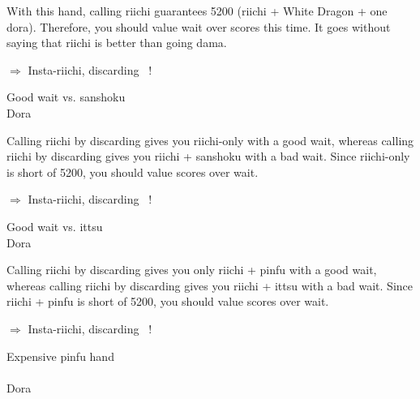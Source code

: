\noindent With this hand, calling riichi guarantees 5200 (riichi + White Dragon + one {\jap dora}). Therefore, you should value wait over scores this time. It goes without saying that riichi is better than going {\jap dama}. 

\begin{center}
{\Large $\Rightarrow$ Insta-riichi, discarding  ~!}
\end{center}

\bigskip
\begin{itembox}[r]{Good wait vs. {\jap sanshoku}}
\bp
{}~~\bei\\
\hfill\footnotesize{{\jap Dora}~~~~~~~}
\ep {}
\vspace{-15pt}
\end{itembox}

\noindent Calling riichi by discarding {\LARGE {}} gives you riichi-only with a good wait, whereas calling riichi by discarding {\LARGE {}} gives you riichi + {\jap sanshoku} with a bad wait. Since riichi-only is short of 5200, you should value scores over wait. 

\begin{center}
{\Large $\Rightarrow$ Insta-riichi, discarding  ~!}
\end{center}

\bigskip
\begin{itembox}[r]{Good wait vs. {\jap ittsu}}
\bp
{}~~\bei\\
\hfill\footnotesize{{\jap Dora}~~~~~~~}
\ep {}
\vspace{-15pt}
\end{itembox}

\noindent Calling riichi by discarding {\LARGE {}} gives you only riichi + {\jap pinfu} with a good wait, whereas calling riichi by discarding {\LARGE {}} gives you riichi + {\jap ittsu} with a bad wait. Since riichi + {\jap pinfu} is short of 5200, you should value scores over wait. 
\begin{center}
{\Large $\Rightarrow$ Insta-riichi, discarding  ~!}
\end{center}


\bigskip
\begin{itembox}[r]{Expensive {\jap pinfu} hand}
\bp
{}
\\ \vspace{-16pt}
\rfw{}\rfd{}~~\bei\\
\hfill\footnotesize{{\jap Dora}~~~~~~~}
\ep
\end{itembox}

